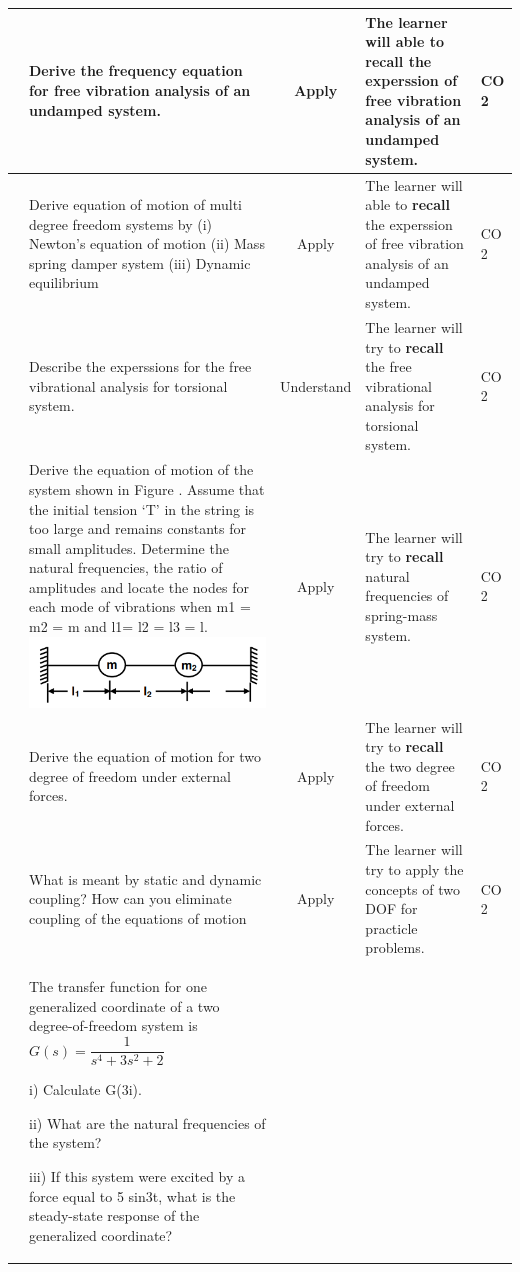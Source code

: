 \documentclass[11pt,paper=a4,answers]{exam}
\begin{document}
\begin{flushleft}
\begin{longtable}{|>{\centering\arraybackslash}p{0.8cm}  | >{\raggedright\arraybackslash}p{6.5cm}  | c | >{\raggedright\arraybackslash}p{5cm} |>{\centering\arraybackslash}p{1cm}|}
		\hline 
		2&	Derive the frequency equation for free vibration analysis of an undamped system.&	Apply&	The learner will able to \textbf{recall} the experssion of free vibration analysis of an undamped system.&	CO 2\\
		\hline 
		3&	Derive equation of motion of multi degree freedom systems by
		(i) Newton’s equation of motion
		(ii) Mass spring damper system
		(iii) Dynamic equilibrium &	Apply&	The learner will able to \textbf{recall} the experssion of free vibration analysis of an undamped system.&	CO 2\\
		\hline 
		4&	Describe the experssions for the free vibrational analysis for torsional system.&	Understand&	The learner will try to \textbf{recall} the free vibrational analysis for torsional system. &	CO 2\\
		\hline 		
5	&Derive the equation of motion of the system shown in Figure . Assume that the initial tension ‘T’
	in the string is too large and remains constants for small amplitudes. Determine the natural
	frequencies, the ratio of amplitudes and locate the nodes for each mode of vibrations when m1 = m2
	= m and l1= l2 = l3 = l.	\includegraphics[scale=0.7]{80.png}&	Apply&	The learner will try to \textbf{recall} natural frequencies of spring-mass system.&	CO 2\\
		\hline 
		6& Derive the equation of motion for two degree of freedom under external forces.	&	Apply&	The learner will try to \textbf{recall} the two degree of freedom under external forces.&	CO 2\\
		\hline 
		7& What is meant by static and dynamic coupling? How can you eliminate coupling of the
		equations of motion
	&	Apply&	The learner will try to apply the concepts of two DOF for practicle problems. &	CO 2\\
		\hline 
8&	The transfer function for one generalized coordinate of a two degree-of-freedom
system is $G(s)=\dfrac{1}{s^{4}+3s^{2}+2}$

i) Calculate G(3i).

ii) What are the natural frequencies of the system?

iii) If this system were excited by a force equal to 5 sin3t, what is the
steady-state response of the generalized coordinate?


\end{longtable}
\end{flushleft}
\end{document}
